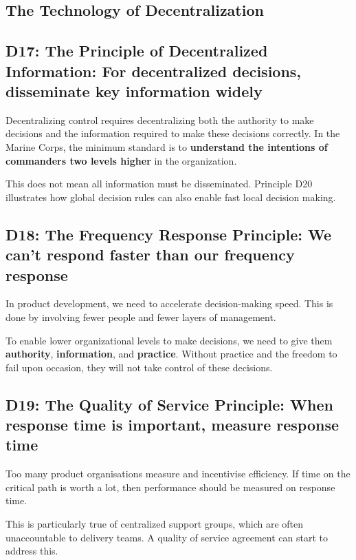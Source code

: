 \documentclass{article}
\begin{document}
\begin{center}
  \section{The Technology of Decentralization}
\end{center}

\begin{multicols}{2}

\subsection{D17: The Principle of Decentralized Information: For decentralized decisions, disseminate key information widely}

Decentralizing control requires decentralizing both the authority to make decisions and the information required to make these decisions correctly. In the Marine Corps, the minimum standard is to \textbf{understand the intentions of commanders two levels higher} in the organization.

This does not mean all information must be disseminated. Principle D20 illustrates how global decision rules can also enable fast local decision making.

\subsection{D18: The Frequency Response Principle: We can’t respond faster than our frequency response}

In product development, we need to accelerate decision-making speed. This is done by involving fewer people and fewer layers of management.

To enable lower organizational levels to make decisions, we need to give them \textbf{authority}, \textbf{information}, and \textbf{practice}. Without practice and the freedom to fail upon occasion, they will not take control of these decisions.

\subsection{D19: The Quality of Service Principle: When response time is important, measure response time}

Too many product organisations measure and incentivise efficiency. If time on the critical path is worth a lot, then performance should be measured on response time.

This is particularly true of centralized support groups, which are often unaccountable to delivery teams. A quality of service agreement can start to address this.


\end{multicols}
\end{document}
